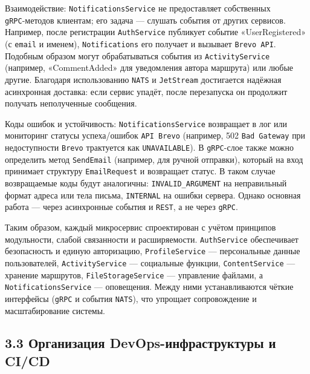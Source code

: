 Взаимодействие: \texttt{NotificationsService} не предоставляет собственных \\ \texttt{gRPC}-методов клиентам; его задача — слушать события от других сервисов. Например, после регистрации \texttt{AuthService} публикует событие «UserRegistered» (с \texttt{email} и именем), \texttt{Notifications} его получает и вызывает \texttt{Brevo API}. Подобным образом могут обрабатываться события из \texttt{ActivityService} (например, «CommentAdded» для уведомления автора маршрута) или любые другие. Благодаря использованию \texttt{NATS} и \texttt{JetStream} достигается надёжная асинхронная доставка: если сервис упадёт, после перезапуска он продолжит получать неполученные сообщения.

Коды ошибок и устойчивость: \texttt{NotificationsService} возвращает в лог или мониторинг статусы успеха/ошибок \texttt{API Brevo} (например, 502 \texttt{Bad Gateway} при недоступности \texttt{Brevo} трактуется как \texttt{UNAVAILABLE}). В \texttt{gRPC}-слое также можно определить метод \texttt{SendEmail} (например, для ручной отправки), который на вход принимает структуру \texttt{EmailRequest} и возвращает статус. В таком случае возвращаемые коды будут аналогичны: \texttt{INVALID\_ARGUMENT} на неправильный формат адреса или тела письма, \texttt{INTERNAL} на ошибки сервера. Однако основная работа — через асинхронные события и \texttt{REST}, а не через \texttt{gRPC}.

Таким образом, каждый микросервис спроектирован с учётом принципов модульности, слабой связанности и расширяемости. \texttt{AuthService} обеспечивает безопасность и единую авторизацию, \texttt{ProfileService} — персональные данные пользователей, \texttt{ActivityService} — социальные функции, \texttt{ContentService} — хранение маршрутов, \texttt{FileStorageService} — управление файлами, а \\ \texttt{NotificationsService} — оповещения. Между ними устанавливаются чёткие интерфейсы (\texttt{gRPC} и события \texttt{NATS}), что упрощает сопровождение и масштабирование системы. 

\subsection*{3.3 Организация DevOps-инфраструктуры и CI/CD}

